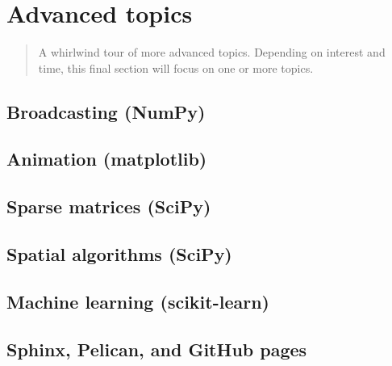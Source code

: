 \chapter{Advanced topics}

\begin{abstract}
A whirlwind tour of more advanced topics.  Depending on interest and time,
this final section will focus on one or more topics.
\end{abstract}

\section{Broadcasting (NumPy)}

\section{Animation (matplotlib)}

\section{Sparse matrices (SciPy)}

\section{Spatial algorithms (SciPy)}

\section{Machine learning (scikit-learn)}

\section{Sphinx, Pelican, and GitHub pages}
